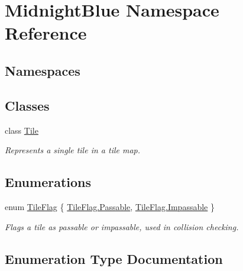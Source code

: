 \hypertarget{namespace_midnight_blue}{}\section{Midnight\+Blue Namespace Reference}
\label{namespace_midnight_blue}
\subsection*{Namespaces}
\begin{DoxyCompactItemize}
\end{DoxyCompactItemize}
\subsection*{Classes}
\begin{DoxyCompactItemize}
\item 
class \hyperlink{class_midnight_blue_1_1_tile}{Tile}
\begin{DoxyCompactList}\small\item\em Represents a single tile in a tile map. \end{DoxyCompactList}\end{DoxyCompactItemize}
\subsection*{Enumerations}
\begin{DoxyCompactItemize}
\item 
enum \hyperlink{namespace_midnight_blue_ad3f455dc6bab1e76768d1a468ae3e33b}{Tile\+Flag} \{ \hyperlink{namespace_midnight_blue_ad3f455dc6bab1e76768d1a468ae3e33ba01bb7f8bb1804fb74130d34c8c977a99}{Tile\+Flag.\+Passable}, 
\hyperlink{namespace_midnight_blue_ad3f455dc6bab1e76768d1a468ae3e33ba02518d4f54df131d84d3b77bcb2bdce4}{Tile\+Flag.\+Impassable}
 \}\begin{DoxyCompactList}\small\item\em Flags a tile as passable or impassable, used in collision checking. \end{DoxyCompactList}
\end{DoxyCompactItemize}


\subsection{Enumeration Type Documentation}
\hypertarget{namespace_midnight_blue_ad3f455dc6bab1e76768d1a468ae3e33b}{}\label{namespace_midnight_blue_ad3f455dc6bab1e76768d1a468ae3e33b} 
